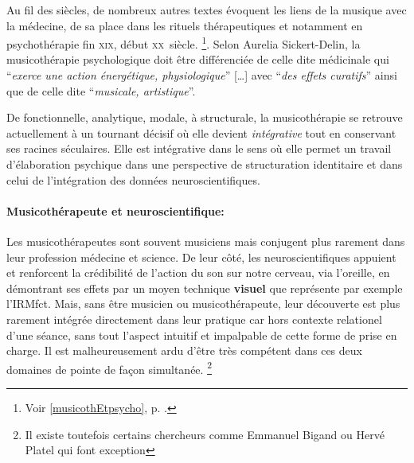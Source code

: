  Au fil des siècles, de nombreux autres 
textes évoquent les liens de la musique avec la médecine, de sa place dans les 
rituels thérapeutiques et notamment en psychothérapie fin \textsc{xix}\ieme, 
début \textsc{xx}\ieme\ siècle. \footnote{Voir \ref{musicothEtpsycho},
  p. \pageref{musicothEtpsycho}.}.
Selon Aurelia Sickert-Delin, la musicothérapie 
psychologique doit être différenciée de celle dite médicinale qui 
\enquote{\emph{exerce une action 
énergétique, physiologique}} [\dots] avec \enquote{\emph{des effets curatifs}}  
ainsi que de celle dite \enquote{\emph{musicale, artistique}}. 

 De fonctionnelle, analytique, mo\-da\-le,  à 
struc\-tu\-rale, la musicothérapie se retrouve actuellement 
 à un tournant décisif où elle devient 
 \emph{intégrative} tout en conservant ses racines séculaires. Elle est 
intégrative dans le sens où elle permet un travail d'élaboration psychique dans une perspective de structuration identitaire \autocite[ch. III, p. 53, 
105]{vrait_musicotherapie_2018} et dans celui de l'intégration des données 
neuroscientifiques.
 


 
\paragraph{Musicothérapeute et neuroscientifique: }

 
Les musicothérapeutes sont souvent musiciens mais conjugent plus
rarement dans leur profession
médecine et science. De leur côté, les neuroscientifiques appuient
et renforcent la crédibilité de l'action du son sur notre cerveau, via
l'oreille, en démontrant ses effets par un moyen technique
\textbf{visuel} que représente par exemple l'IRMfct. Mais, sans être musicien ou
musicothérapeute, leur découverte est plus rarement intégrée
directement dans leur pratique car hors contexte relationel d'une
séance, sans 
tout l'aspect intuitif et impalpable de cette forme de prise
en charge.
Il est malheureusement ardu d'être très compétent dans ces deux domaines
de pointe de façon simultanée.   \footnote  {Il existe toutefois certains chercheurs
comme Emmanuel Bigand ou Hervé Platel qui font exception}

